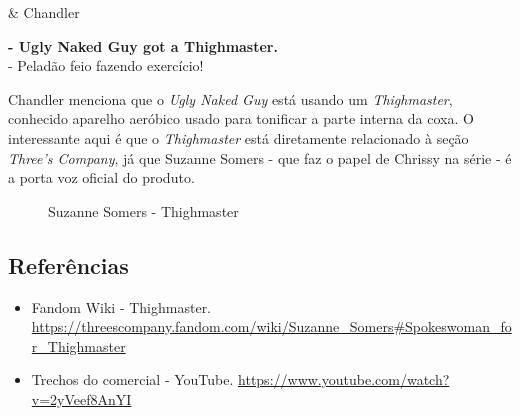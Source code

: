 \begin{tcolorbox}[enhanced,center upper,
    drop fuzzy shadow southeast, boxrule=0.3pt,
    lower separated=false,
    colframe=black!30!dialogoBorder,colback=white]
\begin{minipage}[c]{0.16\linewidth}
   & \centering \scriptsize{Chandler}
\end{minipage}
\hfill
\begin{minipage}[c]{0.8\linewidth}
  \textbf{- Ugly Naked Guy got a Thighmaster.}\\
  - Peladão feio fazendo exercício!
\end{minipage}
\end{tcolorbox}

Chandler menciona que o \emph{Ugly Naked Guy} está usando um
\emph{Thighmaster}, conhecido aparelho aeróbico usado para tonificar a
parte interna da coxa. O interessante aqui é que o \emph{Thighmaster}
está diretamente relacionado à seção \emph{Three's Company}, já que
Suzanne Somers - que faz o papel de Chrissy na série - é a porta voz
oficial do produto.

\begin{figure}
  \centering
    \caption{Suzanne Somers - Thighmaster\label{fig:suzanne-somers-thighmaster}}
\end{figure}

\hypertarget{referuxeancias-2}{%
\subsection{Referências}\label{referuxeancias-2}}

\begin{itemize}
\tightlist
\item
  \sloppy Fandom Wiki - Thighmaster. \url{https://threescompany.fandom.com/wiki/Suzanne_Somers#Spokeswoman_for_Thighmaster}
\item
  \sloppy Trechos do comercial - YouTube. \url{https://www.youtube.com/watch?v=2yVeef8AnYI}
\end{itemize}

